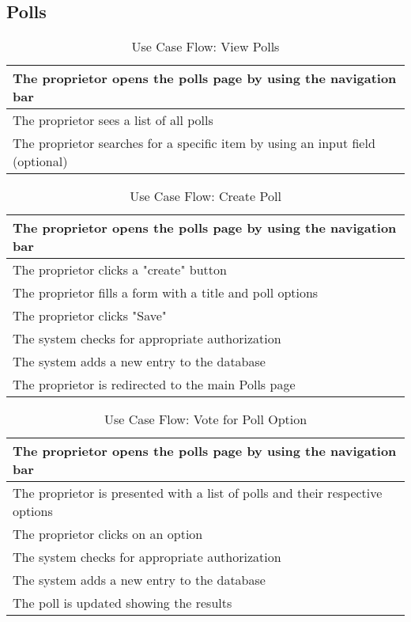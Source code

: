 \subsection{Polls}
\begin{table}[H]
  \begin{tabularx}{\linewidth}{|X|}
    \hline
     The proprietor opens the polls page by using the navigation bar \\
     \hline
     The proprietor sees a list of all polls \\
     \hline
     The proprietor searches for a specific item by using an input field (optional) \\
     \hline 
  \end{tabularx}
  \caption{Use Case Flow: View Polls}
\end{table}

\begin{table}[H]
    \begin{tabularx}{\linewidth}{|X|}
      \hline
       The proprietor opens the polls page by using the navigation bar \\
       \hline
       The proprietor clicks a "create" button \\
       \hline
       The proprietor fills a form with a title and poll options \\
       \hline
       The proprietor clicks "Save" \\
       \hline
       The system checks for appropriate authorization \\
       \hline
       The system adds a new entry to the database \\
       \hline
       The proprietor is redirected to the main Polls page \\
       \hline 
    \end{tabularx}
    \caption{Use Case Flow: Create Poll}
  \end{table}

  \begin{table}[H]
    \begin{tabularx}{\linewidth}{|X|}
      \hline
       The proprietor opens the polls page by using the navigation bar \\
       \hline
       The proprietor is presented with a list of polls and their respective options \\
       \hline
       The proprietor clicks on an option \\
       \hline
       The system checks for appropriate authorization \\
       \hline
       The system adds a new entry to the database \\
       \hline
       The poll is updated showing the results \\
       \hline 
    \end{tabularx}
    \caption{Use Case Flow: Vote for Poll Option}
  \end{table}


